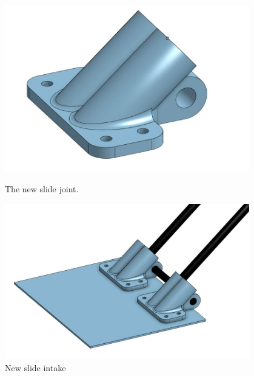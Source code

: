 

\begin{figure}[ht]
\centering
\begin{minipage}[b]{.48\textwidth}
  \centering
  \includegraphics[width=0.95\textwidth]{Meetings/October/10-30-21/10-30-21_CAD_Figure2 - Nathan Forrer.JPG}
  \caption{The new slide joint.}
  \label{fig:103021_1}
\end{minipage}%
\hfill%
\begin{minipage}[b]{.48\textwidth}
  \centering
  \includegraphics[width=0.95\textwidth]{Meetings/October/10-30-21/10-30-21_CAD_Figure3 - Nathan Forrer.JPG}
  \caption{New slide intake}
  \label{fig:103021_2}
\end{minipage}
\end{figure}

